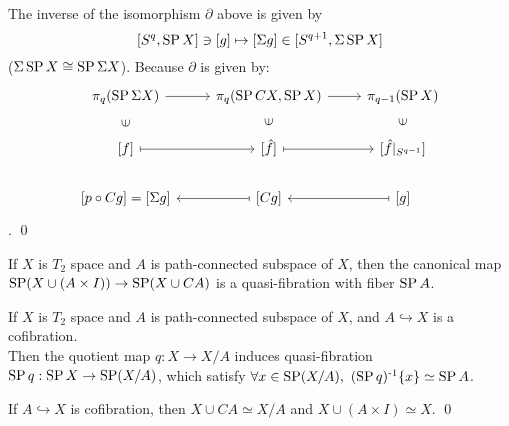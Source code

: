     \begin{note}
        The inverse of the isomorphism $\partial$ above is given by
        $$
        [S^q , \operatorname{SP} X] \ni [g] \mapsto [\Sigma g] \in [S^{q+1}, \Sigma \operatorname{SP} X]
        $$
        ($\Sigma \operatorname{SP} X \cong \operatorname{SP} \Sigma X$).
        Because $\partial$ is given by:
        \[\begin{tikzcd}
            {\pi_q(\SP \Sigma X)} & {\pi_q(\SP CX, \SP X)} & {\pi_{q-1}(\SP X)} \\
            {[f]} & {[\hat{f}]} & {[\hat{f}|_{S^{q-1}}]} \\
            {[p \circ Cg] = [\Sigma g]} & {[Cg]} & {[g]}
            \arrow[from=1-1, to=1-2]
            \arrow[from=1-2, to=1-3]
            \arrow[maps to, from=2-1, to=2-2]
            \arrow[maps to, from=2-2, to=2-3]
            \arrow["\ni"{marking}, draw=none, from=1-1, to=2-1]
            \arrow["\ni"{marking}, draw=none, from=1-2, to=2-2]
            \arrow["\ni"{marking}, draw=none, from=1-3, to=2-3]
            \arrow[maps to, from=3-3, to=3-2]
            \arrow[maps to, from=3-2, to=3-1]
        \end{tikzcd}\].
        \qed
    \end{note}

    \begin{cor}
        \label{hyp:quasi-fibration-SP(XUAxI)-to-SP(XUCA)}
        If $X$ is $T_2$ space and $A$ is path-connected subspace of $X$,
        then the canonical map
        $\operatorname{SP} (X \cup (A \times I)) \to \operatorname{SP} (X \cup C A)$ 
        is a quasi-fibration with fiber $\operatorname{SP} A$.
    \end{cor}

    \begin{thm}
        \label{hyp:quasi-fibration-SPX-to-SP(X/A)}
        If $X$ is $T_2$ space and $A$ is path-connected subspace of $X$,
        and $A \hookrightarrow X$ is a cofibration.\\
        Then the quotient map $q : X \to X/A$ induces quasi-fibration
        $\operatorname{SP} q : \operatorname{SP} X \to \operatorname{SP} (X/A)$, which satisfy
        $\forall x \in \operatorname{SP} (X/A), \ (\operatorname{SP} q)^{\text{-}1} \{x\} \simeq  \operatorname{SP} A $.
    \end{thm}

    \begin{prf}
        If $A \hookrightarrow X$ is cofibration,
        then $X \cup C A \simeq X/A $ and $X \cup (A \times I) \simeq X$.
        \qed
    \end{prf}

